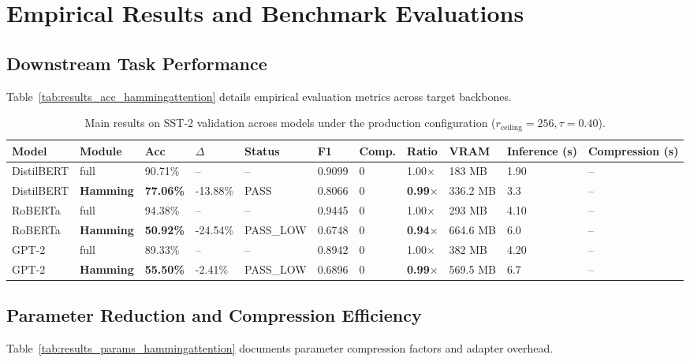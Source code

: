 \section{Empirical Results and Benchmark Evaluations}

\subsection{Downstream Task Performance}
Table~\ref{tab:results_acc_hammingattention} details empirical evaluation metrics across target backbones.

\begin{table}[t]
\centering
\small
\begin{tabular}{lllllllllll}
\toprule
\textbf{Model} & \textbf{Module} & \textbf{Acc} & \textbf{$\Delta$} & \textbf{Status} & \textbf{F1} & \textbf{Comp.} & \textbf{Ratio} & \textbf{VRAM} & \textbf{Inference (s)} & \textbf{Compression (s)} \\
\midrule
DistilBERT & full & 90.71\% & -- & -- & 0.9099 & 0 & 1.00$\times$ & 183 MB & 1.90 & -- \\
DistilBERT & \textbf{Hamming} & \textbf{77.06\%} & -13.88\% & PASS & 0.8066 & 0 & \textbf{0.99$\times$} & 336.2 MB & 3.3 & -- \\
RoBERTa & full & 94.38\% & -- & -- & 0.9445 & 0 & 1.00$\times$ & 293 MB & 4.10 & -- \\
RoBERTa & \textbf{Hamming} & \textbf{50.92\%} & -24.54\% & PASS_LOW & 0.6748 & 0 & \textbf{0.94$\times$} & 664.6 MB & 6.0 & -- \\
GPT-2 & full & 89.33\% & -- & -- & 0.8942 & 0 & 1.00$\times$ & 382 MB & 4.20 & -- \\
GPT-2 & \textbf{Hamming} & \textbf{55.50\%} & -2.41\% & PASS_LOW & 0.6896 & 0 & \textbf{0.99$\times$} & 569.5 MB & 6.7 & -- \\
\bottomrule
\end{tabular}
\caption{Main results on SST-2 validation across models under the production configuration ($r_{\mathrm{ceiling}}=256, \tau=0.40$).}
\label{tab:main_sst2}
\end{table}

\subsection{Parameter Reduction and Compression Efficiency}
Table~\ref{tab:results_params_hammingattention} documents parameter compression factors and adapter overhead.

